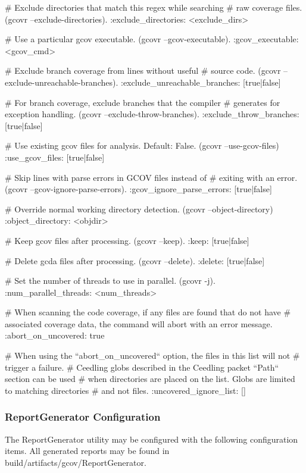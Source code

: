\begin{DoxyCode}
    # Exclude directories that match this regex while searching
    # raw coverage files. (gcovr --exclude-directories).
    :exclude\_directories: <exclude\_dirs>

    # Use a particular gcov executable. (gcovr --gcov-executable).
    :gcov\_executable: <gcov\_cmd>

    # Exclude branch coverage from lines without useful
    # source code. (gcovr --exclude-unreachable-branches).
    :exclude\_unreachable\_branches: [true|false]

    # For branch coverage, exclude branches that the compiler
    # generates for exception handling. (gcovr --exclude-throw-branches).
    :exclude\_throw\_branches: [true|false]

    # Use existing gcov files for analysis. Default: False. (gcovr --use-gcov-files)
    :use\_gcov\_files: [true|false]

    # Skip lines with parse errors in GCOV files instead of
    # exiting with an error. (gcovr --gcov-ignore-parse-errors).
    :gcov\_ignore\_parse\_errors: [true|false]

    # Override normal working directory detection. (gcovr --object-directory)
    :object\_directory: <objdir>

    # Keep gcov files after processing. (gcovr --keep).
    :keep: [true|false]

    # Delete gcda files after processing. (gcovr --delete).
    :delete: [true|false]

    # Set the number of threads to use in parallel. (gcovr -j).
    :num\_parallel\_threads: <num\_threads>

  # When scanning the code coverage, if any files are found that do not have
  # associated coverage data, the command will abort with an error message.
  :abort\_on\_uncovered: true

  # When using the ``abort\_on\_uncovered`` option, the files in this list will not
  # trigger a failure.
  # Ceedling globs described in the Ceedling packet ``Path`` section can be used
  # when directories are placed on the list. Globs are limited to matching directories
  # and not files.
  :uncovered\_ignore\_list: []
\end{DoxyCode}


\subsubsection*{Report\+Generator Configuration}

The Report\+Generator utility may be configured with the following configuration items. All generated reports may be found in {\ttfamily build/artifacts/gcov/\+Report\+Generator}.


